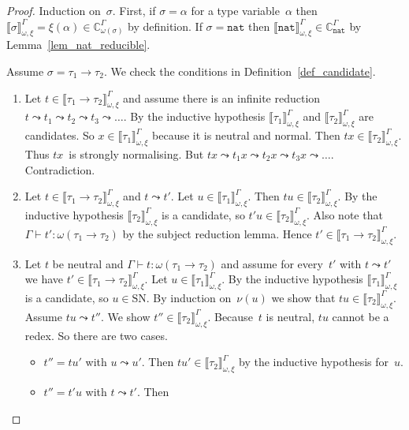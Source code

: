 \documentclass[runningheads,a4paper]{llncs}
\newcommand{\nat}{\mathtt{nat}}
\newcommand{\SN}{\mathrm{SN}}
\newcommand{\Cb}{\mathbb{C}}
\newcommand{\val}[3]{\ensuremath{\llbracket#1\rrbracket_{#2}^{#3}}}
\newcommand{\proves}{\vdash}
\begin{document}
\begin{proof}
  Induction on~$\sigma$. First, if $\sigma = \alpha$ for a type
  variable~$\alpha$ then
  $\val{\sigma}{\omega,\xi}{\Gamma} = \xi(\alpha) \in
  \Cb_{\omega(\sigma)}^\Gamma$ by definition. If $\sigma = \nat$ then
  $\val{\nat}{\omega,\xi}{\Gamma} \in \Cb_{\nat}^\Gamma$ by
  Lemma~\ref{lem_nat_reducible}.

  Assume $\sigma = \tau_1 \to \tau_2$. We check the conditions in
  Definition~\ref{def_candidate}.
  \begin{enumerate}
  \item Let $t \in \val{\tau_1\to\tau_2}{\omega,\xi}{\Gamma}$ and
    assume there is an infinite reduction
    $t \leadsto t_1 \leadsto t_2 \leadsto t_3 \leadsto \ldots$. By the
    inductive hypothesis $\val{\tau_1}{\omega,\xi}{\Gamma}$ and
    $\val{\tau_2}{\omega,\xi}{\Gamma}$ are candidates. So
    $x \in \val{\tau_1}{\omega,\xi}{\Gamma}$ because it is neutral and
    normal. Then $t x \in \val{\tau_2}{\omega,\xi}{\Gamma}$. Thus
    $t x$~is strongly normalising. But
    $t x \leadsto t_1 x \leadsto t_2 x \leadsto t_3 x \leadsto
    \ldots$. Contradiction.
  \item Let $t \in \val{\tau_1\to\tau_2}{\omega,\xi}{\Gamma}$ and
    $t \leadsto t'$. Let $u \in
    \val{\tau_1}{\omega,\xi}{\Gamma}$. Then
    $t u \in \val{\tau_2}{\omega,\xi}{\Gamma}$. By the inductive
    hypothesis $\val{\tau_2}{\omega,\xi}{\Gamma}$ is a candidate, so
    $t' u \in \val{\tau_2}{\omega,\xi}{\Gamma}$. Also note that
    $\Gamma \proves t' : \omega(\tau_1 \to \tau_2)$ by the subject
    reduction lemma. Hence
    $t' \in \val{\tau_1\to\tau_2}{\omega,\xi}{\Gamma}$.
  \item Let $t$ be neutral and
    $\Gamma \proves t : \omega(\tau_1 \to \tau_2)$ and assume for
    every~$t'$ with $t \leadsto t'$ we have
    $t' \in \val{\tau_1\to\tau_2}{\omega,\xi}{\Gamma}$. Let
    $u \in \val{\tau_1}{\omega,\xi}{\Gamma}$. By the inductive
    hypothesis $\val{\tau_1}{\omega,\xi}{\Gamma}$ is a candidate, so
    $u \in \SN$. By induction on~$\nu(u)$ we show that
    $t u \in \val{\tau_2}{\omega,\xi}{\Gamma}$. Assume
    $t u \leadsto t''$. We show
    $t'' \in \val{\tau_2}{\omega,\xi}{\Gamma}$. Because~$t$ is
    neutral, $t u$ cannot be a redex. So there are two cases.
    \begin{itemize}
    \item $t'' = t u'$ with $u \leadsto u'$. Then
      $t u' \in \val{\tau_2}{\omega,\xi}{\Gamma}$ by the inductive
      hypothesis for~$u$.
    \item $t'' = t' u$ with $t \leadsto t'$. Then

\end{itemize}
\end{enumerate}
\end{proof}
\end{document}
